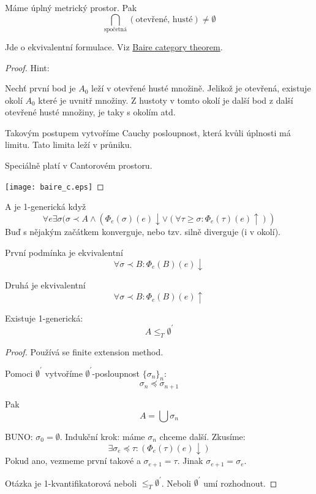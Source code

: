 \begin{theorem}
	Máme úplný metrický prostor. Pak
	\[ \bigcap_{\text{spočetná}} (\text{otevřené, husté}) \ne \emptyset \]

	Jde o ekvivalentní formulace. Viz \href{https://en.wikipedia.org/wiki/Baire_category_theorem}{Baire category theorem}.
\end{theorem}
\begin{proof}
	Hint:

	Nechť první bod je $A_0$ leží v otevřené husté množině.
	Jelikož je otevřená, existuje okolí $A_0$ které je uvnitř množiny.
	Z hustoty v tomto okolí je další bod z další otevřené husté množiny, je taky s okolím atd.

	Takovým postupem vytvoříme Cauchy posloupnost, která kvůli úplnosti má limitu.
	Tato limita leží v průniku.

	Speciálně platí v Cantorovém prostoru.

	\texttt{[image: baire\_c.eps]}
\end{proof}

\begin{definition}[1-generická]
	A je 1-generická když
	\[ \forall e \exists \sigma(\sigma \prec A \land (\Phi_e(\sigma)(e)\downarrow \lor (\forall \tau \geq \sigma: \Phi_e(\tau)(e)\uparrow)) \]
	Buď s nějakým začátkem konverguje, nebo tzv. silně diverguje (i v okolí).

	První podmínka je ekvivalentní
	\[ \forall \sigma \prec B: \Phi_e(B)(e) \downarrow \]

	Druhá je ekvivalentní
	\[ \forall \sigma \prec B: \Phi_e(B)(e) \uparrow \]
\end{definition}

\begin{theorem}
	Existuje 1-generická:
	\[ A \leq_T \emptyset^{\prime} \]
\end{theorem}
\begin{proof}
	Používá se finite extension method.

	Pomoci $\emptyset^{\prime}$ vytvoříme $\emptyset^{\prime}$-posloupnost $\{\sigma_n\}_n$:
	\[ \sigma_n \preccurlyeq \sigma_{n + 1} \]

	Pak
	\[ A = \bigcup \sigma_n \]

	BUNO: $\sigma_0 = \emptyset$.
	Indukční krok: máme $\sigma_n$ chceme další.
	Zkusíme:
	\[ \exists \sigma_e \preccurlyeq \tau: (\Phi_e(\tau)(e)\downarrow) \]
	Pokud ano, vezmeme první takové a $\sigma_{e + 1} = \tau$.
	Jinak $\sigma_{e + 1} = \sigma_e$.

	Otázka je 1-kvantifikatorová neboli $\leq_T \emptyset^{\prime}$. Neboli $\emptyset^{\prime}$ umí rozhodnout.
\end{proof}

